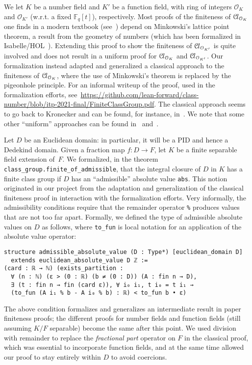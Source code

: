 \documentclass[a4paper,USenglish,cleveref, autoref, thm-restate]{lipics-v2021}
\newcommand{\lean}[1]{\texttt{#1}\xspace}
\newcommand*{\OK}[1][K]{\mathcal{O}_{#1}}
\newcommand*{\Cl}{\mathcal{C}\kern-.075em l}
\newcommand*{\Fq}[1][q]{\mathbb{F}_{#1}}
\begin{document}
We let $K$ be a number field and $K'$ be a function field, with ring of integers $\OK$ and $\OK[K']$ (w.r.t. a fixed $\Fq[q][t]$), respectively. 
Most proofs of the finiteness of $\Cl_{\OK}$ one finds in a modern textbook (see~\cite[Theorems 4.4,~5.3,~6.3]{Neukirch}) depend on Minkowski's lattice point theorem, a result from the geometry of numbers (which has been formalized in Isabelle/HOL~\cite{Minkowskis_Theorem-AFP}).
Extending this proof to show the finiteness of $\Cl_{\OK[K']}$ is quite involved and does not result in a uniform proof for $\Cl_{\OK}$ and $\Cl_{\OK[K']}$.
Our formalization instead adapted and generalized a classical approach to the finiteness of $\Cl_{\OK}$, where the use of Minkowski's theorem is replaced by the pigeonhole principle. 
For an informal writeup of the proof, used in the formalization efforts, see~\url{https://github.com/lean-forward/class-number/blob/itp-2021-final/FiniteClassGroup.pdf}.
The classical approach seems to go back to Kronecker
and can be found, for instance, in~\cite{Ireland-Rosen}.
We note that some other ``uniform'' approaches can be found in~\cite{Artin-Whaples} and~\cite{Stasinski}.

Let $D$ be an Euclidean domain: in particular, it will be a PID and hence a Dedekind domain. Given a fraction map $f \colon D \to F$, let $K$ be a finite separable field extension of~$F$.
We formalized, in the theorem \lean{class\_group.finite\_of\_admissible}, that the integral closure of $D$ in $K$ has a finite class group if $D$ has an ``admissible'' absolute value \lean{abs}.
This notion originated in our project from the adaptation and generalization of the classical finiteness proof in interaction with the formalization efforts.
Very informally, the admissibility conditions require that the remainder operator \lean{\%} produces values that are not too far apart.
Formally, we defined the type of admissible absolute values on $D$ as follows, where \lean{to\_fun} is local notation for an application of the absolute value operator:
\pagebreak[3] %
\begin{lstlisting}
structure admissible_absolute_value (D : Type*) [euclidean_domain D]
  extends euclidean_absolute_value D ℤ :=
(card : ℝ → ℕ) (exists_partition :
  ∀ (n : ℕ) (ε > (0 : ℝ) (b ≠ (0 : D)) (A : fin n → D),
  ∃ (t : fin n → fin (card ε)), ∀ i₀ i₁, t i₀ = t i₁ →
  (to_fun (A i₁ % b - A i₀ % b) : ℝ) < to_fun b • ε)
\end{lstlisting}

The above condition formalizes and generalizes an intermediate result in paper finiteness proofs;
the different proofs for number fields and function fields (still assuming $K/F$ separable) become the same after this point.
We used division with remainder to replace the \emph{fractional part} operator on $F$ in the classical proof, which was essential to incorporate function fields, and at the same time allowed our proof to stay entirely within $D$ to avoid coercions.
\end{document}
